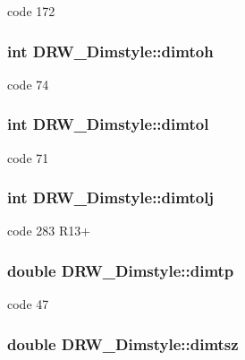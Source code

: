 code 172 \hypertarget{classDRW__Dimstyle_a1b18fcdd37b17dda1613d19b3302c7b1}{
\subsubsection[{dimtoh}]{\setlength{\rightskip}{0pt plus 5cm}int D\-R\-W\-\_\-\-Dimstyle\-::dimtoh}}\label{classDRW__Dimstyle_a1b18fcdd37b17dda1613d19b3302c7b1}
code 74 \hypertarget{classDRW__Dimstyle_a68bc1acdadaa4511180645a648c911a1}{
\subsubsection[{dimtol}]{\setlength{\rightskip}{0pt plus 5cm}int D\-R\-W\-\_\-\-Dimstyle\-::dimtol}}\label{classDRW__Dimstyle_a68bc1acdadaa4511180645a648c911a1}
code 71 \hypertarget{classDRW__Dimstyle_a0aff1bb2b68293702729f84e751bea0a}{
\subsubsection[{dimtolj}]{\setlength{\rightskip}{0pt plus 5cm}int D\-R\-W\-\_\-\-Dimstyle\-::dimtolj}}\label{classDRW__Dimstyle_a0aff1bb2b68293702729f84e751bea0a}
code 283 R13+ \hypertarget{classDRW__Dimstyle_a6596806a922534a220ce3b7f7b4bb415}{
\subsubsection[{dimtp}]{\setlength{\rightskip}{0pt plus 5cm}double D\-R\-W\-\_\-\-Dimstyle\-::dimtp}}\label{classDRW__Dimstyle_a6596806a922534a220ce3b7f7b4bb415}
code 47 \hypertarget{classDRW__Dimstyle_a4b8018caf9bdf34b2002efce8929dc57}{
\subsubsection[{dimtsz}]{\setlength{\rightskip}{0pt plus 5cm}double D\-R\-W\-\_\-\-Dimstyle\-::dimtsz}}\label{classDRW__Dimstyle_a4b8018caf9bdf34b2002efce8929dc57}
